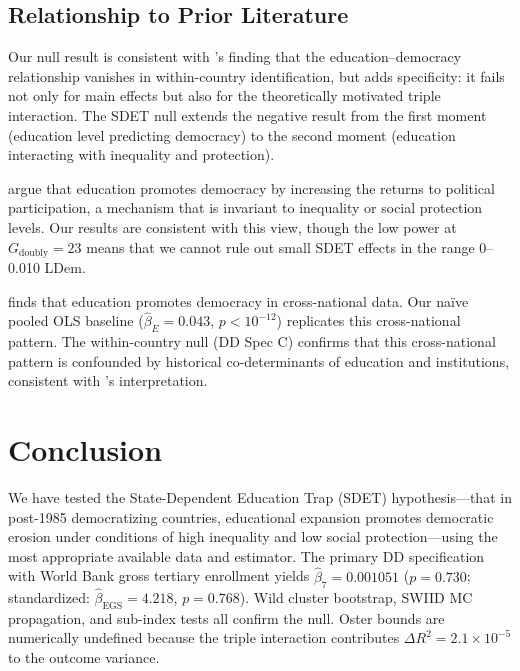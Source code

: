 \documentclass[11pt,letterpaper]{article}
\begin{document}
\subsection{Relationship to Prior Literature}

Our null result is consistent with \citet{Acemoglu2008}'s finding that the education--democracy
relationship vanishes in within-country identification, but adds specificity: it fails not only for
main effects but also for the theoretically motivated triple interaction. The SDET null extends the
\citet{Acemoglu2008} negative result from the first moment (education level predicting democracy)
to the second moment (education interacting with inequality and protection).

\citet{Glaeser2007} argue that education promotes democracy by increasing the returns to political
participation, a mechanism that is invariant to inequality or social protection levels. Our results
are consistent with this view, though the low power at $G_\text{doubly} = 23$ means that we cannot
rule out small SDET effects in the range 0--0.010 LDem.

\citet{Barro1999} finds that education promotes democracy in cross-national data. Our na\"{i}ve
pooled OLS baseline ($\hat{\beta}_E = 0.043$, $p < 10^{-12}$) replicates this cross-national
pattern. The within-country null (DD Spec C) confirms that this cross-national pattern is
confounded by historical co-determinants of education and institutions, consistent with
\citet{Acemoglu2008}'s interpretation.

\section{Conclusion}
\label{sec:conclusion}

We have tested the State-Dependent Education Trap (SDET) hypothesis---that in post-1985
democratizing countries, educational expansion promotes democratic erosion under conditions of high
inequality and low social protection---using the most appropriate available data and estimator.
The primary DD specification with World Bank gross tertiary enrollment yields $\hat{\beta}_7 =
0.001051$ ($p = 0.730$; standardized: $\hat{\beta}_\text{EGS} = 4.218$, $p = 0.768$). Wild cluster
bootstrap, SWIID MC propagation, and sub-index tests all confirm the null. Oster bounds are
numerically undefined because the triple interaction contributes $\Delta R^2 = 2.1 \times 10^{-5}$
to the outcome variance.
\end{document}
